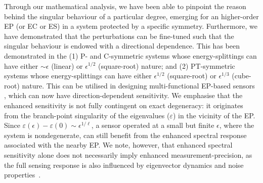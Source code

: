 \documentclass[aps, prb, onecolumn, nofootinbib, citeautoscript, 10pt]{revtex4-2}
\begin{document}
Through our mathematical analysis, we have been able to pinpoint the reason behind the singular behaviour of a particular degree, emerging for an higher-order EP (or EC or ES) in a system protected by a specific symmetry. Furthermore, we have demonstrated that the perturbations can be fine-tuned such that the singular behaviour is endowed with a directional dependence. This has been demonstrated in the (1) P- and C-symmetric systems whose energy-splittings can have either $\sim \epsilon$ (linear) or $\epsilon^{1/2}$ (square-root) nature; and (2) PT-symmetric systems whose energy-splittings can have either $\epsilon^{1/2}$ (square-root) or $\epsilon^{1/3}$ (cube-root) nature. This can be utilised in designing multi-functional EP-based sensors \cite{emil-budich}, which can now have direction-dependent sensitivity. 
We emphasise that the enhanced sensitivity is not fully contingent on exact degeneracy: it originates from the branch-point singularity of the eigenvalues ($ \varepsilon $) in the vicinity of the EP. Since
$ \varepsilon(\epsilon)-\varepsilon(0) \sim \epsilon^{1/\ell} $, a sensor operated at a small but finite $\epsilon$, where the system is nondegenerate, can still benefit from the enhanced spectral response associated with the nearby EP. We note, however, that enhanced spectral sensitivity alone does not necessarily imply enhanced measurement-precision, as the full sensing response is also influenced by eigenvector dynamics and noise properties~\cite{Langbein,emil-budich}.
\end{document}
